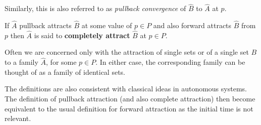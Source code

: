 Similarly, this is also referred to as {\em pullback convergence} of
$\hat{B}$ to $\hat{A}$ at $p$.

\begin{defn}
If $\hat{A}$ pullback attracts $\hat{B}$ at some value of $p \in P$ and
also forward attracts $\hat{B}$ from $p$ then $\hat{A}$ is said to {\bf
completely attract} $\hat{B}$ at $p \in P$.
\end{defn}

Often we are concerned only with the attraction of single sets or of a
single set $B$ to a family $\hat{A}$, for some $p \in P$.  In either case,
the corresponding family can be thought of as a family of identical
sets.

The definitions are also consistent with classical ideas in autonomous
systems. The definition of pullback attraction (and also complete
attraction) then become equivalent to the usual definition for forward
attraction as the initial time is not relevant.

